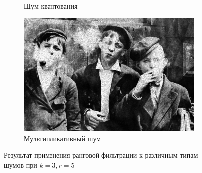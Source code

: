 \begin{figure}[ht!]
\begin{subfigure}[b]{0.5\linewidth}
      \caption{Шум квантования} 
      \label{rang_3_5:e}
    \end{subfigure}%
    \begin{subfigure}[b]{0.5\linewidth}
        \centering
        \includegraphics[width=0.95\linewidth]{../Rang_Filter/Rang_Speckle_noise_(k=3,r=5).jpg} 
        \caption{Мультипликативный шум} 
        \label{rang_3_5:f} 
    \end{subfigure} 
    \caption{Результат применения ранговой фильтрации к различным типам шумов при $k = 3, r = 5$}
    \label{img:rang_3_5} 
\end{figure}

